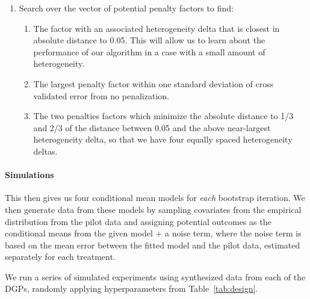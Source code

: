 \documentclass[letterpaper, 12pt, parskip=full,DIV=10]{scrartcl}
\begin{document}
\begin{enumerate}
\begin{enumerate}
\end{enumerate}
\item Search over the vector of potential penalty factors to find:
\begin{enumerate}
\item The factor with an associated heterogeneity delta that is closest in absolute distance to 0.05. This will allow us to learn about the performance of our algorithm in a case with a small amount of heterogeneity. 
\item The largest penalty factor within one standard deviation of cross validated error from no penalization. 
\item The two penalties factors which minimize the absolute distance to 1/3 and 2/3 of the distance between 0.05 and the above near-largest heterogeneity delta, so that we have four equally spaced heterogeneity deltas. 
\end{enumerate}
\end{enumerate}

\paragraph{Simulations}
This then gives us four conditional mean models for \textit{each} bootstrap iteration. We then generate data from these models by sampling covariates from the empirical distribution from the pilot data and assigning potential outcomes as the conditional means from the given model + a noise term, where the noise term is based on the mean error between the fitted model and the pilot data, estimated separately for each treatment. 

We run a series of simulated experiments using synthesized data from each of the DGPs, randomly applying hyperparameters from Table~\ref{tab:design}. 
\end{document}
